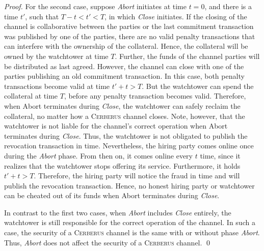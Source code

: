 \documentclass[runningheads]{llncs}
\newcommand{\sys}{\textsc{Cerberus}\xspace}
\begin{document}
\begin{proof}
For the second case, suppose \textit{Abort} initiates at time $t=0$, and there is a time $t'$, such that $T-t < t'< T$, in which \textit{Close} initiates.
If the closing of the channel is collaborative between the parties or the last commitment transaction was published by one of the parties, there are no valid penalty transactions that can interfere with the ownership of the collateral. Hence, the collateral will be owned by the watchtower at time $T$.
Further, the funds of the channel parties will be distributed as last agreed.
However, the channel can close with one of the parties publishing an old commitment transaction.
In this case, both penalty transactions become valid at time $t'+t>T$. But the watchtower can spend the collateral at time $T$, before any penalty transaction becomes valid.
Therefore, when {Abort} terminates during \textit{Close}, the watchtower can safely reclaim the collateral, no matter how a \sys channel closes.
Note, however, that the watchtower is not liable for the channel's correct operation when {Abort} terminates during \textit{Close}.
Thus, the watchtower is not obligated to publish the revocation transaction in time.
Nevertheless, the hiring party comes online once during the \textit{Abort} phase. From then on, it comes online every $t$ time, since it realizes that the watchtower stops offering its service. Furthermore, it holds $t'+t>T$.
Therefore, the hiring party will notice the fraud in time and will publish the revocation transaction.
Hence, no honest hiring party or watchtower can be cheated out of its funds when {Abort} terminates during \textit{Close}.


In contrast to the first two cases, when \textit{Abort} includes \textit{Close} entirely, the watchtower is still responsible for the correct operation of the channel.
In such a case, the security of a \sys channel is the same with or without phase \textit{Abort}.
Thus, \textit{Abort} does not affect the security of a \sys channel.
\hfill \qed
\end{proof}
\end{document}
